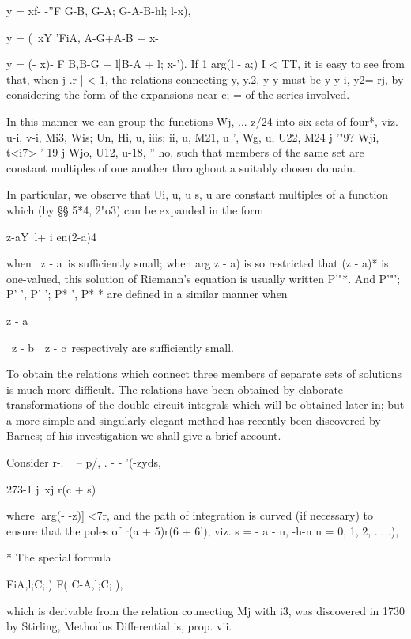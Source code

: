 y = xf- -''F G-B, G-A; G-A-B-hl; l-x),

y = (\ xY 'FiA, A-G+\;A-B + \; x-%

y = (- x)- F B,B-G + l]B-A + l; x-'). If 1 arg(l - a;) I < TT, it is
easy to see from that, when j .r | < 1, the relations
connecting y, y.2, y y must be y y-i, y2= rj, by considering the
form of the expansions near c; = of the series involved.

In this manner we can group the functions Wj, ... z/24 into six sets
of four*, viz. u-i, v-i, Mi3, Wis; Un, Hi, u, iiis; ii, u, M21, u
', Wg, u, U22, M24 j '"9? Wji, t<i7> ' 19 j Wjo, U12, u-18, '' ho,
such that members of the same set are constant multiples of one
another throughout a suitably chosen domain.

In particular, we observe that Ui, u, u s, u are constant multiples
of a function which (by §§ 5*4, 2"o3) can be expanded in the form

 z-aY\ l+ i en(2-a)4

when \ z - a\ is sufficiently small; when arg z - a) is so restricted
that (z - a)* is one-valued, this solution of Riemann's equation is
usually written P'"*. And P'"'; P' ', P' '; P* ', P* * are defined in
a similar manner when

z - a

\ z - b\, \ z - c\ respectively are sufficiently small.

To obtain the relations which connect three members of separate sets
of solutions is much more difficult. The relations have been obtained
by elaborate transformations of the double circuit integrals which
will be obtained later in; but a more simple and singularly
elegant method has recently been discovered by Barnes; of his
investigation we shall give a brief account.


Consider r-. ~ -- p/, . - - '(-zyds,

273-1 j\ xj r(c + s)

where |arg(- -z)] <7r, and the path of integration is curved (if
necessary) to ensure that the poles of r(a + 5)r(6 + 6'), viz. s = - a
- n, -h-n n = 0, 1, 2, . . .),

* The special formula

FiA,l;C;.) F( C-A,l;C; ),

which is derivable from the relation counectiug Mj with i3, was
discovered in 1730 by Stirling, Methodus Differential is, prop. vii.


